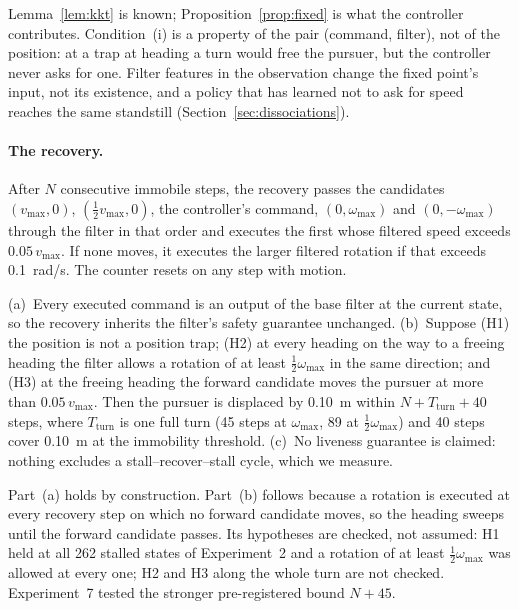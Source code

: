 \documentclass{l4dc2027}
\newcommand{\vmax}{v_{\max}}
\newcommand{\wmax}{\omega_{\max}}
\begin{document}
Lemma~\ref{lem:kkt} is known; Proposition~\ref{prop:fixed} is what the controller contributes. Condition~(i) is a property of the pair (command, filter), not of the position: at a trap at heading a turn would free the pursuer, but the controller never asks for one. Filter features in the observation change the fixed point's input, not its existence, and a policy that has learned not to ask for speed reaches the same standstill (Section~\ref{sec:dissociations}).

\paragraph{The recovery.}\label{sec:recovery} After $N$ consecutive immobile steps, the recovery passes the candidates $(\vmax, 0)$, $(\tfrac12\vmax, 0)$, the controller's command, $(0, \wmax)$ and $(0, -\wmax)$ through the filter in that order and executes the first whose filtered speed exceeds $0.05\,\vmax$. If none moves, it executes the larger filtered rotation if that exceeds \SI{0.1}{rad/s}. The counter resets on any step with motion.

\begin{proposition}[Recovery]\label{prop:recovery}
(a)~Every executed command is an output of the base filter at the current state, so the recovery inherits the filter's safety guarantee unchanged. (b)~Suppose (H1) the position is not a position trap; (H2) at every heading on the way to a freeing heading the filter allows a rotation of at least $\tfrac12\wmax$ in the same direction; and (H3) at the freeing heading the forward candidate moves the pursuer at more than $0.05\,\vmax$. Then the pursuer is displaced by \SI{0.10}{m} within $N + T_{\mathrm{turn}} + 40$ steps, where $T_{\mathrm{turn}}$ is one full turn (45 steps at $\wmax$, 89 at $\tfrac12\wmax$) and 40 steps cover \SI{0.10}{m} at the immobility threshold. (c)~No liveness guarantee is claimed: nothing excludes a stall--recover--stall cycle, which we measure.
\end{proposition}

Part~(a) holds by construction. Part~(b) follows because a rotation is executed at every recovery step on which no forward candidate moves, so the heading sweeps until the forward candidate passes. Its hypotheses are checked, not assumed: H1 held at all 262 stalled states of Experiment~2 and a rotation of at least $\tfrac12\wmax$ was allowed at every one; H2 and H3 along the whole turn are not checked. Experiment~7 tested the stronger pre-registered bound $N + 45$.
\end{document}
